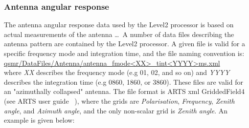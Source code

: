 \subsubsection*{Antenna angular response}

The antenna angular response data used by the Level2 processor
is based on actual measurements of the antenna \dots{}\
A number of data files describing the antenna pattern
are contained by the Level2 processor.
A given file is valid for a specific frequency mode and integration
time, and the file naming convention is:\\
\url{qsmr/DataFiles/Antenna/antenna_fmode<XX>_tint<YYYY>ms.xml}\\
where \emph{XX} describes the frequency mode (e.g 01, 02, and so on)
and \emph{YYYY} describes the integration time (e.g 0860, 1860, or 3860).
These files are valid for an "azimuthally collapsed"
antenna. The file format is ARTS xml GriddedField4 (see ARTS user guide ~\citep{artsug}),
where the grids are \emph{Polarisation}, \emph{Frequency}, \emph{Zenith angle},
and \emph{Azimuth angle}, and the only non-scalar grid is \emph{Zenith angle}.
An example is given below:


